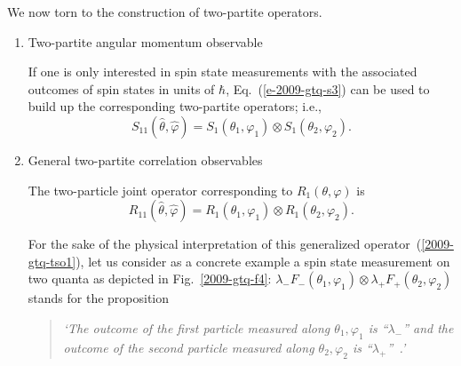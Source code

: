 \documentclass[fleqn,twoside]{article}      %
\begin{document}
We now torn to the construction of two-partite operators.
\begin{enumerate}

\item{Two-partite angular momentum observable}

If one is only interested in spin state measurements with the associated outcomes of spin states in units of $\hbar$,
Eq.~(\ref{e-2009-gtq-s3}) can be used to build up the corresponding two-partite operators; i.e.,
\begin{equation}
 S_{1 1 } ({\hat \theta},{\hat \varphi} ) =
S_{1 }( \theta_1,\varphi_1 )
\otimes
S_{1 }( \theta_2,\varphi_2 ).
\label{2004-gtq-e3F3nat}
\end{equation}


\item{General two-partite correlation observables}

The two-particle joint operator corresponding to $R_1(\theta ,\varphi )$ is
\begin{equation}
\label{2009-gtq-tso1}
R_{11}(\hat \theta ,\hat \varphi) = R_1(\theta_1 ,\varphi_1)\otimes R_1(\theta_2 ,\varphi_2)
.
\end{equation}

For the sake of the physical interpretation of this generalized operator~(\ref{2009-gtq-tso1}), let us consider as a concrete example
a spin state measurement on two quanta as depicted in Fig.~\ref{2009-gtq-f4}:
$\lambda_{-} F_{-}(\theta_1 ,\varphi_1)\otimes  \lambda_{+} F_{+}(\theta_2 ,\varphi_2 )$  stands for the proposition
\begin{quote}
{\em `The outcome of the first particle measured along $\theta_1,\varphi_1$ is ``$\lambda_-$''
      and
      the outcome of the second particle measured along $\theta_2,\varphi_2$ is ``$\lambda_+$''~.'
}
\end{quote}


\end{enumerate}
\end{document}
